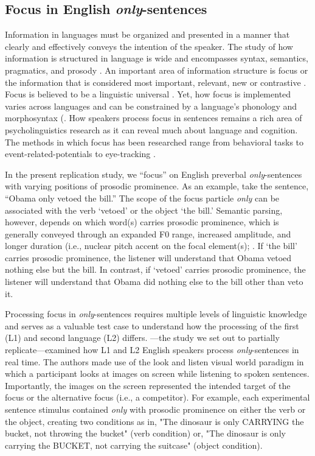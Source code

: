 \subsection{Focus in English \textit{only}-sentences}

Information in languages must be organized and presented in a manner that clearly and effectively conveys the intention of the speaker. The study of how information is structured in language is wide and encompasses syntax, semantics, pragmatics, and prosody \citep[see ][] {Breen2010, Lambrecht1994, Roberts2012}. An important area of information structure is focus or the information that is considered most important, relevant, new or contrastive \citep{Kiss1998}. Focus is believed to be a linguistic universal \citep{Comrie1989}. Yet, how focus is implemented varies across languages and can be constrained by a language’s phonology and morphosyntax (\citep{Kiss1998, Lambrecht1994}. How speakers process focus in sentences remains a rich area of psycholinguistics research as it can reveal much about language and cognition. The methods in which focus has been researched range from behavioral tasks \citep[e.g.,][] {Cutler1979, Paterson1999} to event-related-potentials \citep[e.g.,][] {Chen2014, Wang2011} to eye-tracking \citep[e.g.,][] {Filik2005, Hohle2016}.

In the present replication study, we “focus” on English preverbal \textit{only}-sentences with varying positions of prosodic prominence. As an example, take the sentence, “Obama only vetoed the bill.” The scope of the focus particle \textit{only} can be associated with the verb ‘vetoed’ or the object ‘the bill.’ Semantic parsing, however, depends on which word(s) carries prosodic prominence, which is generally conveyed through an expanded F0 range, increased amplitude, and longer duration (i.e., nuclear pitch accent on the focal element(s); \citep{Breen2010, Gussenhoven1983}.  If ‘the bill’ carries prosodic prominence, the listener will understand that Obama vetoed nothing else but the bill. In contrast, if ‘vetoed’ carries prosodic prominence, the listener will understand that Obama did nothing else to the bill other than veto it. 

Processing focus in \textit{only}-sentences requires multiple levels of linguistic knowledge and serves as a valuable test case to understand how the processing of the first (L1) and second language (L2) differs. \cite{Ge2021}---the study we set out to partially replicate---examined how L1 and L2 English speakers process \textit{only}-sentences in real time. The authors made use of the look and listen visual world paradigm in which a participant looks at images on screen while listening to spoken sentences. Importantly, the images on the screen represented the intended target of the focus or the alternative focus (i.e., a competitor). For example, each experimental sentence stimulus contained \textit{only} with prosodic prominence on either the verb or the object, creating two conditions as in, "The dinosaur is only CARRYING the bucket, not throwing the bucket" (verb condition) or, "The dinosaur is only carrying the BUCKET, not carrying the suitcase" (object condition).

